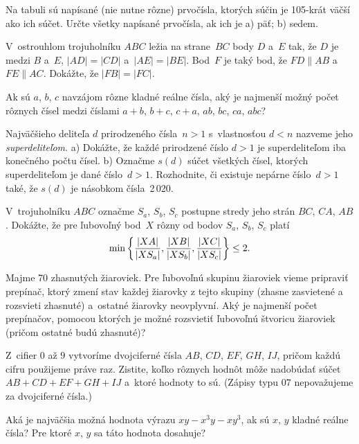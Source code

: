 ﻿{%
Na tabuli sú napísané (nie nutne rôzne) prvočísla, ktorých súčin je 105-krát väčší ako ich súčet. Určte všetky napísané prvočísla, ak ich je
\ite a) päť;
\ite b) sedem.}

{%
V~ostrouhlom trojuholníku $ABC$ ležia na strane~$BC$ body $D$ a~$E$ tak, že $D$ je medzi $B$ a~$E$, $|AD| = |CD|$ a~$|AE| = |BE|$. Bod~$F$ je taký bod, že $FD \parallel AB$ a~$FE \parallel AC$. Dokážte, že $|FB| = |FC|$.
}

{%
Ak sú $a$, $b$, $c$ navzájom rôzne kladné reálne čísla, aký je
najmenší možný počet rôznych čísel medzi číslami
$a+b$, $b+c$, $c+a$, $ab$, $bc$, $ca$, $abc$?}

{%
Najväčšieho deliteľa $d$ prirodzeného čísla~$n>1$ s~vlastnosťou $d<n$ nazveme
jeho {\it superdeliteľom}.
\ite a)
Dokážte, že každé prirodzené číslo $d>1$ je superdeliteľom iba konečného počtu čísel.
\ite b)
Označme $s(d)$ súčet všetkých čísel, ktorých superdeliteľom
je dané číslo~${d>1}$. Rozhodnite, či existuje nepárne
číslo~$d>1$ také, že $s(d)$ je násobkom čísla~2\,020.\endgraf
}

{%
V~trojuholníku $ABC$ označme $S_a$, $S_b$, $S_c$ postupne stredy jeho
strán $BC$, $CA$, $AB$. Dokážte, že pre ľubovoľný bod~$X$ rôzny
od bodov $S_a$, $S_b$, $S_c$ platí
$$
\min \left \{\frac {|XA|}{|XS_a|}, \frac {|XB|}{|XS_b|},
\frac {|XC|}{|XS_c|} \right\} \le 2.
\belowdisplayskip0pt
$$}

{%
Majme 70 zhasnutých žiaroviek.
Pre ľubovoľnú skupinu žiaroviek vieme pripraviť prepínač,
ktorý zmení stav každej žiarovky z tejto skupiny (zhasne
zasvietené a rozsvieti zhasnuté) a~ostatné žiarovky neovplyvní.
Aký je najmenší počet prepínačov, pomocou ktorých je
možné rozsvietiť ľubovoľnú štvoricu žiaroviek (pričom ostatné budú
zhasnuté)?}

{%
Z~cifier $0$ až $9$ vytvoríme dvojciferné čísla $AB$, $CD$, $EF$,
$GH$, $IJ$, pričom každú cifru použijeme práve raz. Zistite,
koľko rôznych hodnôt môže nadobúdať súčet $AB+CD+EF+GH+IJ$ a~ktoré
hodnoty to sú.
(Zápisy typu $07$ nepovažujeme za dvojciferné čísla.)}

{%
Aká je najväčšia možná hodnota výrazu $xy-x^3y-xy^3$, ak sú
$x$, $y$ kladné reálne čísla?
Pre ktoré $x$, $y$ sa táto hodnota dosahuje?}

